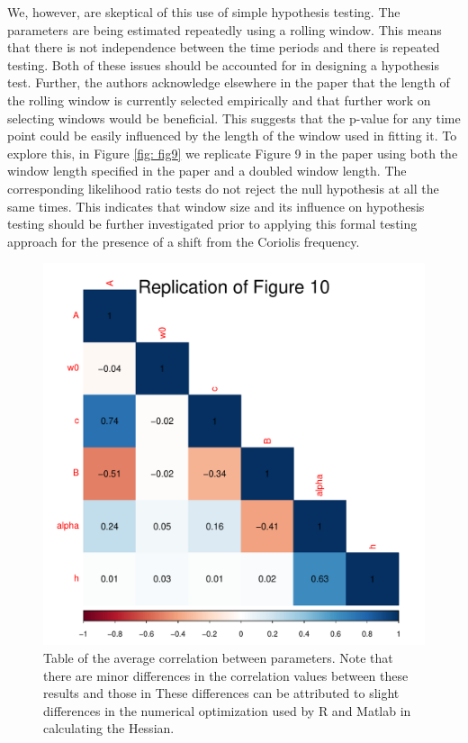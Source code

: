 \documentclass{stat572Style}
\begin{document}
\par We, however, are skeptical of this use of simple hypothesis testing. 
The parameters are being estimated repeatedly using a rolling window. 
This means that there is not independence between the time periods and there is repeated testing. 
Both of these issues should be accounted for in designing a hypothesis test. 
Further, the authors acknowledge elsewhere in the paper that the length of the rolling window is currently selected empirically and that further work on selecting windows would be beneficial. 
This suggests that the p-value for any time point could be easily influenced by the length of the window used in fitting it.
To explore this, in Figure \ref{fig: fig9} we replicate Figure 9  in the paper using both the window length specified in the paper and a doubled window length.
The corresponding likelihood ratio tests do not reject the null hypothesis at all the same times. 
This indicates that window size and its influence on hypothesis testing should be further investigated prior to applying this formal testing approach for the presence of a shift from the Coriolis frequency. 




 \begin{figure}[h!]
  \centering
    \includegraphics[width=.6\textwidth]{ReplicatedFigures/fig10.pdf}
        \caption{Table of the average correlation between parameters. Note that there are  minor differences in the correlation values between these results and those in \citet{Sykulski2016} These differences can be attributed to slight differences in the numerical optimization used by R and Matlab in calculating the Hessian. }
        	\label{fig: fig10}
\end{figure}
\end{document}
